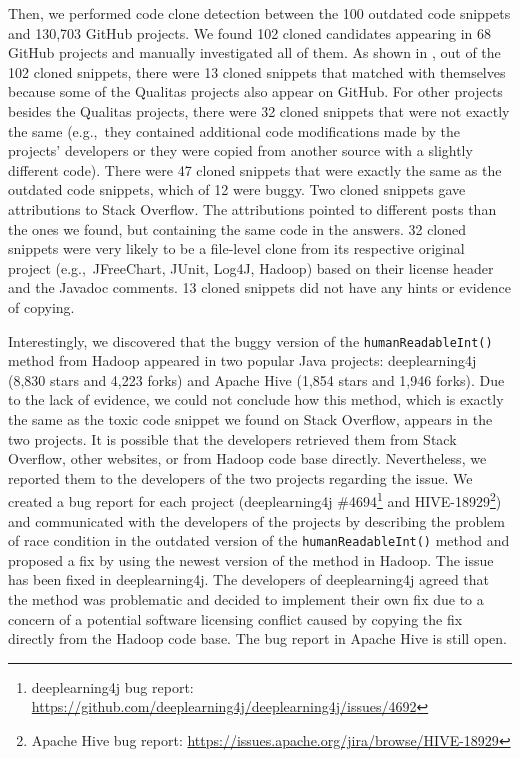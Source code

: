 \documentclass[10pt,journal,compsoc]{IEEEtran}
\begin{document}
Then, we performed code clone detection between the 100 outdated code snippets and 130,703 GitHub projects.
We found 102 cloned candidates appearing in 68 GitHub projects and manually investigated all
of them. As shown in , out of the 102 cloned snippets, there were
13 cloned snippets that matched with themselves because some of the Qualitas
projects also appear on GitHub. For other projects besides the Qualitas
projects, there were 32 cloned snippets that were not exactly the same
(e.g.,~they contained additional code modifications made by the projects'
developers or they were copied from another source with a slightly different code).
There were 47 cloned snippets that were exactly the same as the
outdated code snippets, which of 12 were buggy.
Two cloned snippets gave attributions to Stack Overflow. The attributions
pointed to different posts than the ones we found, but containing the same code
in the answers. 32 cloned snippets were very likely to be a file-level
clone from its respective original project (e.g.,~JFreeChart, JUnit, Log4J,
Hadoop) based on their license header and the Javadoc comments. 
13 cloned snippets did not have any hints or evidence of copying.

Interestingly, we discovered that the buggy version of the
\texttt{humanReadableInt()} method from Hadoop appeared in two popular Java
projects: deeplearning4j (8,830 stars and 4,223 forks) and Apache Hive (1,854
stars and 1,946 forks). Due to the lack of evidence, we could not conclude how
this method, which is exactly the same as the toxic code snippet we found on
Stack Overflow, appears in the two projects. It is possible that the developers
retrieved them from Stack Overflow, other websites, or from Hadoop code base
directly. Nevertheless, we reported them to the developers of the two projects
regarding the issue. We created a bug report for each project (deeplearning4j
\#4694\footnote{deeplearning4j bug report:
	\url{https://github.com/deeplearning4j/deeplearning4j/issues/4692}} and
HIVE-18929\footnote{Apache Hive bug report: \url{
		https://issues.apache.org/jira/browse/HIVE-18929}}) and communicated with the
developers of the projects by describing the problem of race condition in the
outdated version of the \texttt{humanReadableInt()} method and proposed a fix by
using the newest version of the method in Hadoop. The issue has been fixed in
deeplearning4j. The developers of deeplearning4j agreed that the method was
problematic and decided to implement their own fix due to a concern of a
potential software licensing conflict caused by copying the fix directly from
the Hadoop code base. The bug report in Apache Hive is still open.
\end{document}
